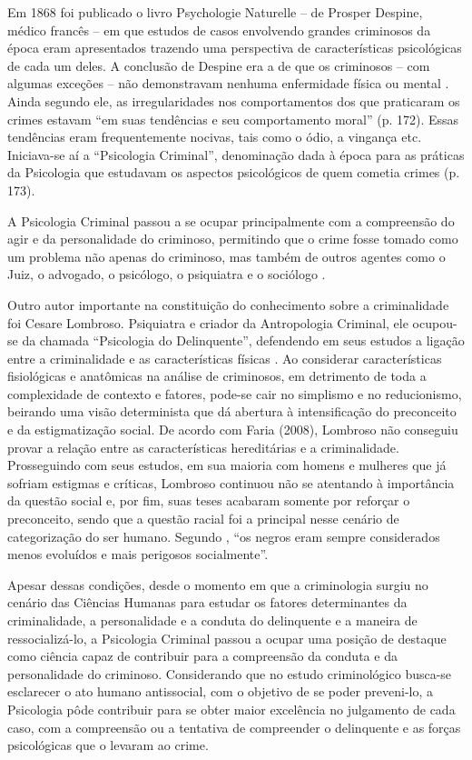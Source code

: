 Em 1868 foi publicado o livro Psychologie Naturelle -- de Prosper Despine, médico francês -- em que estudos de casos envolvendo grandes criminosos da época eram apresentados trazendo uma perspectiva de características psicológicas de cada um deles. A conclusão de Despine era a de que os criminosos -- com algumas exceções -- não demonstravam nenhuma enfermidade física ou mental \cite{LEAL2008}. Ainda segundo ele, as irregularidades nos comportamentos dos que praticaram os crimes estavam ``em suas tendências e seu comportamento moral'' (p. 172). Essas tendências eram frequentemente nocivas, tais como o ódio, a vingança etc. Iniciava-se aí a ``Psicologia Criminal'', denominação dada à época para as práticas da Psicologia que estudavam os aspectos psicológicos de quem cometia crimes (p. 173). 
	
A Psicologia Criminal passou a se ocupar principalmente com a compreensão do agir e da personalidade do criminoso, permitindo que o crime fosse tomado como um problema não apenas do criminoso, mas também de outros agentes como o Juiz, o advogado, o psicólogo, o psiquiatra e o sociólogo .

Outro autor importante na constituição do conhecimento sobre a criminalidade foi Cesare Lombroso. Psiquiatra e criador da Antropologia Criminal, ele ocupou-se da chamada ``Psicologia do Delinquente'', defendendo em seus estudos a ligação entre a criminalidade e as características físicas \cite{JESUS2001}. Ao considerar características fisiológicas e anatômicas na análise de criminosos, em detrimento de toda a complexidade de contexto e fatores, pode-se cair no simplismo e no reducionismo, beirando uma visão determinista que dá abertura à intensificação do preconceito e da estigmatização social. De acordo com Faria (2008), Lombroso não conseguiu provar a relação entre as características hereditárias e a criminalidade. Prosseguindo com seus estudos, em sua maioria com homens e mulheres que já sofriam estigmas e críticas, Lombroso continuou não se atentando à importância da questão social e, por fim, suas teses acabaram somente por reforçar o preconceito, sendo que a questão racial foi a principal nesse cenário de categorização do ser humano. Segundo , ``os negros eram sempre considerados menos evoluídos e mais perigosos socialmente''.

Apesar dessas condições, desde o momento em que a criminologia surgiu no cenário das Ciências Humanas para estudar os fatores determinantes da criminalidade, a personalidade e a conduta do delinquente e a maneira de ressocializá-lo, a Psicologia Criminal passou a ocupar uma posição de destaque como ciência capaz de contribuir para a compreensão da conduta e da personalidade do criminoso. Considerando que no estudo criminológico busca-se esclarecer o ato humano antissocial, com o objetivo de se poder preveni-lo, a Psicologia pôde contribuir para se obter maior excelência no julgamento de cada caso, com a compreensão ou a tentativa de compreender o delinquente e as forças psicológicas que o levaram ao crime.

